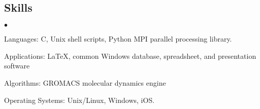 \documentclass[margin,line]{res}
\newenvironment{list2}{
  \begin{list}{$\bullet$}{%
      \setlength{\itemsep}{0in}
      \setlength{\parsep}{0in} \setlength{\parskip}{0in}
      \setlength{\topsep}{0in} \setlength{\partopsep}{0in} 
      \setlength{\leftmargin}{0.2in}}}{\end{list}}
\begin{document}
\begin{resume}
\vspace{-.3cm}

\section{\sc Skills} 
\begin{list2}
\item Languages:  C, Unix shell scripts, Python
  MPI parallel processing library.
\item Applications: \LaTeX, common Windows
  database, spreadsheet, and presentation software
\item Algorithms: GROMACS molecular dynamics engine
\item Operating Systems:  Unix/Linux, Windows, iOS.\\ 
\end{list2}



\end{resume}
\end{document}
